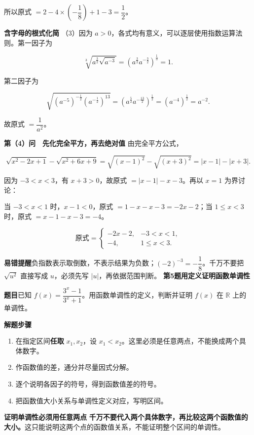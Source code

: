 \documentclass[UTF8,zihao=-4]{ctexart}
\newcommand{\labeltext}[1]{\par\textbf{#1}\quad}
\begin{document}
所以原式 $=2-4\times\left(-\dfrac18\right)+1-3=\boxed{\dfrac12}$。\par
\par{}
\textbf{含字母的根式化简}\quad
（3）因为 $a>0$，各式均有意义，可以逐层使用指数运算法则。第一因子为\par
\[\sqrt[3]{a^{\frac32}\sqrt{a^{-3}}}=\left(a^{\frac32}a^{-\frac32}\right)^{\frac13}=1.\]\par
第二因子为\par
\[\sqrt{(a^{-5})^{-\frac12}(a^{-\frac12})^{13}}=\left(a^{\frac52}a^{-\frac{13}2}\right)^{\frac12}=(a^{-4})^{\frac12}=a^{-2}.\]\par
故原式 $=\boxed{\dfrac1{a^2}}$。\par
\par{}
\textbf{第（4）问　先化完全平方，再去绝对值}\quad
由完全平方公式，\par
\[\sqrt{x^2-2x+1}-\sqrt{x^2+6x+9}=\sqrt{(x-1)^2}-\sqrt{(x+3)^2}=|x-1|-|x+3|.\]\par
因为 $-3<x<3$，有 $x+3>0$，故原式 $=|x-1|-x-3$。再以 $x=1$ 为界讨论：\par
当 $-3<x<1$ 时，$x-1<0$，原式 $=1-x-x-3=-2x-2$；当 $1\le x<3$ 时，原式 $=x-1-x-3=-4$。\par
\[\boxed{\text{原式}=\begin{cases}-2x-2,&-3<x<1,\\-4,&1\le x<3.\end{cases}}\]\par
\labeltext{易错提醒}负指数表示取倒数，不表示结果为负数；$(-2)^{-3}=-\dfrac18$。千万不要把 $\sqrt{u^2}$ 直接写成 $u$，必须先写 $|u|$，再依据范围判断。
\clearpage
{\Large\bfseries 第5题\quad 用定义证明函数单调性}
\labeltext{题目}已知 $f(x)=\dfrac{3^x-1}{3^x+1}$。用函数单调性的定义，判断并证明 $f(x)$ 在 $\mathbb R$ 上的单调性。
\labeltext{解题步骤}\begin{enumerate}
\item 在指定区间\textbf{任取} $x_1,x_2$，设 $x_1<x_2$。这里必须是任意两点，不能换成两个具体数字。
\item 作函数值的差，通分并尽量因式分解。
\item 逐个说明各因子的符号，得到函数值差的符号。
\item 把函数值大小关系与单调性定义对应，写明区间。
\end{enumerate}
\labeltext{证明单调性必须用任意两点}
\textbf{千万不要代入两个具体数字，再比较这两个函数值的大小。}这只能说明这两个点的函数值关系，不能证明整个区间的单调性。\par
\end{document}
